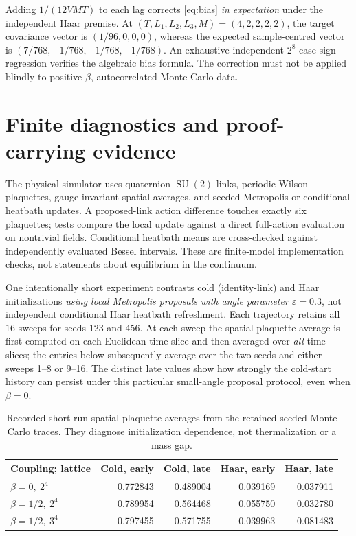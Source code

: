 \documentclass[11pt,a4paper]{article}
\numberwithin{equation}{section}
\newcommand{\SU}{\operatorname{SU}(2)}
\begin{document}
Adding \(1/(12VMT)\) to each lag corrects
\eqref{eq:bias} \emph{in expectation} under the
independent Haar premise. At
\((T,L_1,L_2,L_3,M)=(4,2,2,2,2)\), the target
covariance vector is \((1/96,0,0,0)\), whereas
the expected sample-centred vector is
\((7/768,-1/768,-1/768,-1/768)\).
An exhaustive independent \(2^8\)-case sign
regression verifies the algebraic bias formula.
The correction must not be applied blindly to
positive-\(\beta\), autocorrelated Monte Carlo data.

\section{Finite diagnostics and proof-carrying evidence}
\label{sec:compute}

The physical simulator uses quaternion \(\SU\) links,
periodic Wilson plaquettes, gauge-invariant spatial
averages, and seeded Metropolis or conditional
heatbath updates. A proposed-link action difference
touches exactly six plaquettes; tests compare the
local update against a direct full-action evaluation
on nontrivial fields. Conditional heatbath means are
cross-checked against independently evaluated Bessel
intervals. These are finite-model implementation checks,
not statements about equilibrium in the continuum.

One intentionally short experiment contrasts cold
(identity-link) and Haar initializations \emph{using local
Metropolis proposals with angle parameter \(\varepsilon=0.3\)},
not independent conditional Haar heatbath refreshment.
Each trajectory retains all \(16\) sweeps for seeds
123 and 456. At each sweep the spatial-plaquette
average is first computed on each Euclidean time slice
and then averaged over \emph{all} time slices; the entries
below subsequently average over the two seeds and
either sweeps 1--8 or 9--16.
The distinct late values show how strongly the
cold-start history can persist under this particular
small-angle proposal protocol, even when \(\beta=0\).
\begin{table}[t]
\centering
\small
\begin{tabular}{@{}lrrrr@{}}
\toprule
Coupling; lattice & Cold, early & Cold, late
                  & Haar, early & Haar, late\\
\midrule
\(\beta=0,\ 2^4\)   & 0.772843 & 0.489004 & 0.039169 & 0.037911\\
\(\beta=1/2,\ 2^4\) & 0.789954 & 0.564468 & 0.055750 & 0.032780\\
\(\beta=1/2,\ 3^4\) & 0.797455 & 0.571755 & 0.039963 & 0.081483\\
\bottomrule
\end{tabular}
\caption{Recorded short-run spatial-plaquette averages from
the retained seeded Monte Carlo traces. They diagnose
initialization dependence, not thermalization or a mass gap.}
\label{tab:transients}
\end{table}
\end{document}
